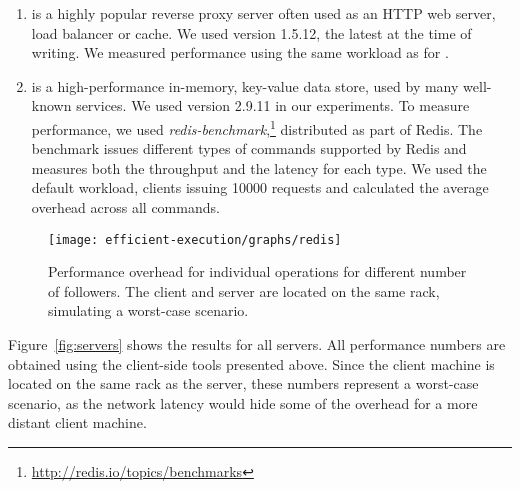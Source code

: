 \begin{enumerate}
\item[\nginx\footnote{\url{http://nginx.org/}}]
is a highly popular reverse proxy server often used as an HTTP web
server, load balancer or cache. We used version 1.5.12, the
latest at the time of writing.  We measured
performance using the same workload as for \lighttpdtwo.


\item[\redis\footnote{\url{http://redis.io/}}]
is a high-performance in-memory, key-value data store, used by many
well-known services. %
We used version 2.9.11 in our experiments.  To measure
performance, we used
\emph{redis-benchmark},\footnote{\url{http://redis.io/topics/benchmarks}}
distributed as part of Redis. The benchmark issues different types
of commands supported by Redis and measures both the throughput and
the latency for each type. We used the default workload, 
clients issuing \num{10000} requests and calculated the average overhead
across all commands.

\end{enumerate}

\begin{figure}[!t]
 \centering
 \texttt{[image: efficient-execution/graphs/redis]}
 \caption{Performance overhead for individual \redis operations for different
 number of followers. The client and server are located on the same rack,
 simulating a worst-case scenario.}
 \label{fig:redis-ops}
\end{figure}

Figure~\ref{fig:servers} shows the results for all servers. All
performance numbers are obtained using the client-side tools presented
above.  Since the client machine is located on the same rack as the
server, these numbers represent a worst-case scenario, as the network
latency would hide some of the overhead for a more distant client
machine.


